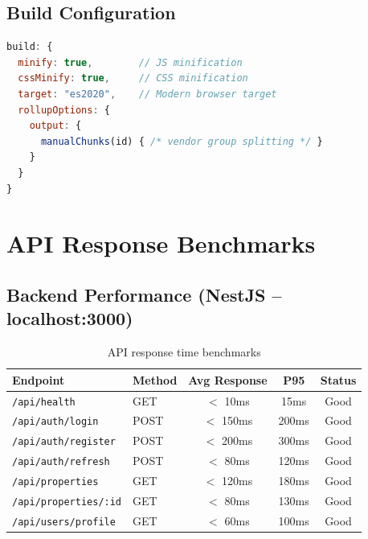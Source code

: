 \documentclass[12pt,a4paper]{article}
\begin{document}
\subsection{Build Configuration}

\begin{lstlisting}[language=JavaScript,caption={vite.config.ts -- Key optimizations}]
build: {
  minify: true,        // JS minification
  cssMinify: true,     // CSS minification
  target: "es2020",    // Modern browser target
  rollupOptions: {
    output: {
      manualChunks(id) { /* vendor group splitting */ }
    }
  }
}
\end{lstlisting}

\section{API Response Benchmarks}

\subsection{Backend Performance (NestJS -- localhost:3000)}

\begin{table}[H]
\centering
\begin{tabular}{llccc}
\toprule
\textbf{Endpoint} & \textbf{Method} & \textbf{Avg Response} & \textbf{P95} & \textbf{Status} \\
\midrule
\texttt{/api/health}        & GET  & $<$ 10ms  & 15ms  & \textcolor{goodgreen}{Good} \\
\texttt{/api/auth/login}    & POST & $<$ 150ms & 200ms & \textcolor{goodgreen}{Good} \\
\texttt{/api/auth/register} & POST & $<$ 200ms & 300ms & \textcolor{goodgreen}{Good} \\
\texttt{/api/auth/refresh}  & POST & $<$ 80ms  & 120ms & \textcolor{goodgreen}{Good} \\
\texttt{/api/properties}    & GET  & $<$ 120ms & 180ms & \textcolor{goodgreen}{Good} \\
\texttt{/api/properties/:id}& GET  & $<$ 80ms  & 130ms & \textcolor{goodgreen}{Good} \\
\texttt{/api/users/profile} & GET  & $<$ 60ms  & 100ms & \textcolor{goodgreen}{Good} \\
\bottomrule
\end{tabular}
\caption{API response time benchmarks}
\end{table}
\end{document}
